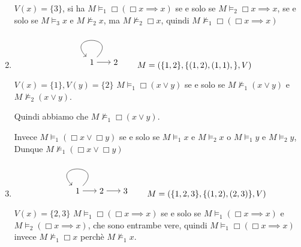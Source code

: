 \documentclass[../main.tex]{subfiles}
\begin{document}
\begin{enumerate}
          $V(x) = \{3\}$, si ha $M \vDash_1 \Box (\Box x \implies x)$ se e solo se $M \vDash_2 \Box x \implies x$, se e solo se $M \vDash_3 x$ e $M \nvDash_2 x$, ma $M \nvDash_2 \Box x$, quindi $M \nvDash_1 \Box (\Box x \implies x)$
    \item \begin{equation*}
              \begin{tikzpicture}[->]
                  \node (1) {1};
                  \node (2) [right of=1] {2};
                  \path
                  (1) edge[loop] node {} (1)
                  (1) edge node {} (2);
              \end{tikzpicture}
              \qquad
              M = (\{1,2\},\{(1,2),(1,1),\}, V)
          \end{equation*}

          $V(x) = \{1\}, V(y) = \{2\}$ $M \vDash_1 \Box (x \lor y)$ se e solo se $M \nvDash_1 (x \lor y)$ e $M \nvDash_2 (x \lor y)$.

          Quindi abbiamo che $M \nvDash_1 \Box (x \lor y)$.

          Invece $M \vDash_1 (\Box x \lor \Box y)$ se e solo se $M \vDash_1 x$ e $M \vDash_2 x$ o $M \vDash_1 y$ e $M \vDash_2 y$, Dunque $M \nvDash_1 (\Box x \lor \Box y)$
    \item \begin{equation*}
              \begin{tikzpicture}[->]
                  \node (1) {1};
                  \node (2) [right of=1] {2};
                  \node (3) [right of=2] {3};
                  \path
                  (1) edge[loop] node {} (1)
                  (1) edge node {} (2)
                  (2) edge node {} (3);
              \end{tikzpicture}
              \qquad
              M = (\{1,2,3\},\{(1,2),(2,3)\}, V)
          \end{equation*}

          $V(x) = \{2,3\}$ $M \vDash_1 \Box (\Box x \implies x)$ se e solo se $M \vDash_1 (\Box x \implies x)$ e $M \vDash_2 (\Box x \implies x)$, che sono entrambe vere, quindi $M \vDash_1 \Box (\Box x \implies x)$ invece $M \nvDash_1 \Box x$ perchè $M \nvDash_1 x$.
\end{enumerate}
\end{document}
